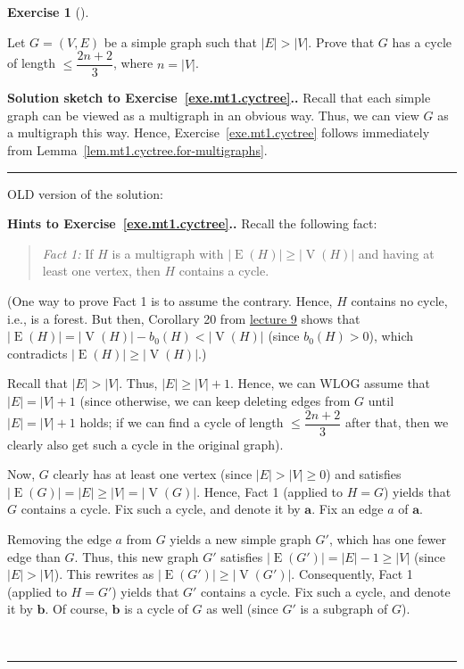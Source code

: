 \documentclass[numbers=enddot,12pt,final,onecolumn,notitlepage]{scrartcl}%
\newcounter{exer}
\theoremstyle{definition}
\newtheorem{exmp}[exer]{Exercise}
\newenvironment{exercise}[1][]
{\begin{exmp}[#1]\begin{leftbar}}
{\end{leftbar}\end{exmp}}
\newenvironment{statement}{\begin{quote}}{\end{quote}}
\newenvironment{proof}[1][Proof]{\noindent\textbf{#1.} }{\ \rule{0.5em}{0.5em}}
\newenvironment{noncompile}{}{}
\newcommand{\abs}[1]{\left| #1 \right|}
\newcommand{\tup}[1]{\left( #1 \right)}
\newcommand{\verts}[1]{\operatorname{V}\left( #1 \right)}
\newcommand{\edges}[1]{\operatorname{E}\left( #1 \right)}
\begin{document}
\begin{exercise} \label{exe.mt1.cyctree}
Let $G = \tup{V, E}$ be a simple graph such that $\abs{E} > \abs{V}$.
Prove that $G$ has a cycle of length $\leq \dfrac{2n+2}{3}$,
where $n = \abs{V}$.
\end{exercise}

\begin{proof}[Solution sketch to Exercise~\ref{exe.mt1.cyctree}.]
Recall that each simple graph can be viewed as a multigraph in an
obvious way. Thus, we can view $G$ as a multigraph this way.
Hence, Exercise~\ref{exe.mt1.cyctree} follows immediately from
Lemma~\ref{lem.mt1.cyctree.for-multigraphs}.
\end{proof}

\begin{noncompile}
OLD version of the solution:

\begin{proof}[Hints to Exercise~\ref{exe.mt1.cyctree}.]
Recall the following fact:
\begin{statement}
\textit{Fact 1:} If $H$ is a multigraph with
$\abs{\edges{H}} \geq \abs{\verts{H}}$ and having at least one vertex,
then $H$ contains a cycle.
\end{statement}
(One way to prove Fact 1 is to assume the contrary. Hence, $H$
contains no cycle, i.e., is a forest. But then, Corollary 20 from
\href{http://www.cip.ifi.lmu.de/~grinberg/t/17s/5707lec9.pdf}{lecture 9}
shows that
$\abs{\edges{H}} = \abs{\verts{H}} - b_0 \tup{H} < \abs{\verts{H}}$
(since $b_0 \tup{H} > 0$), which contradicts
$\abs{\edges{H}} \geq \abs{\verts{H}}$.)

Recall that $\abs{E} > \abs{V}$. Thus,
$\abs{E} \geq \abs{V} + 1$. Hence, we can WLOG assume that
$\abs{E} = \abs{V} + 1$ (since otherwise, we can keep deleting edges
from $G$ until $\abs{E} = \abs{V} + 1$ holds; if we can find a cycle
of length $\leq \dfrac{2n+2}{3}$ after that, then we clearly also get
such a cycle in the original graph).

Now, $G$ clearly has at least one vertex (since $\abs{E} > \abs{V}
\geq 0$) and satisfies
$\abs{\edges{G}} = \abs{E} \geq \abs{V} = \abs{\verts{G}}$.
Hence, Fact 1 (applied to $H = G$) yields that $G$ contains a
cycle. Fix such a cycle, and denote it by $\mathbf{a}$.
Fix an edge $a$ of $\mathbf{a}$.

Removing the edge $a$ from $G$ yields a new simple graph $G'$, which
has one fewer edge than $G$. Thus, this new graph $G'$ satisfies
$\abs{\edges{G'}} = \abs{E} - 1 \geq \abs{V}$ (since $\abs{E} >
\abs{V}$). This rewrites as
$\abs{\edges{G'}} \geq \abs{\verts{G'}}$.
Consequently, Fact 1 (applied to $H = G'$) yields that $G'$
contains a cycle. Fix such a cycle, and denote it by $\mathbf{b}$.
Of course, $\mathbf{b}$ is a cycle of $G$ as well (since $G'$ is a
subgraph of $G$).


\end{proof}
\end{noncompile}
\end{document}
